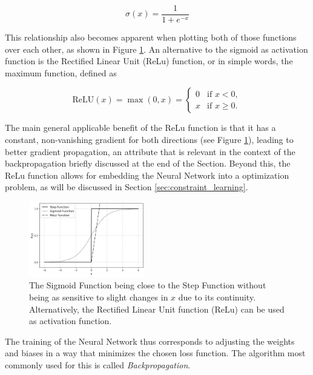 \documentclass[preprint,12pt]{elsarticle}
\begin{document}
\[
\sigma(x) = \frac{1}{1 + e^{-x}}
\]

This relationship also becomes apparent when plotting both of those functions over each other, as shown in Figure \ref{fig:activation_functions}. 
An alternative to the sigmoid as activation function is the Rectified Linear Unit (ReLu) function, or in simple words, the maximum function, defined as

\[
\text{ReLU}(x) = \max(0, x) = 
\begin{cases}
	0 & \text{if } x < 0, \\
	x & \text{if } x \geq 0.
\end{cases}
\]

The main general applicable benefit of the ReLu function is that it has a constant, non-vanishing gradient for both directions (see Figure \ref{fig:activation_functions}), leading to better gradient propagation, an attribute that is relevant in the context of the backpropagation briefly discussed at the end of the Section. \cite{preprintReLuGlorot}
Beyond this, the ReLu function allows for embedding the Neural Network into a optimization problem, as will be discussed in Section \ref{sec:constraint_learning}.

\begin{figure}[h] 
	\centering
	\includegraphics[width=0.45\textwidth]{../figures/modelling/activation_functions.png} %
	\caption{The Sigmoid Function being close to the Step Function without being as sensitive to slight changes in $x$ due to its continuity. Alternatively, the Rectified Linear Unit function (ReLu) can be used as activation function. }
	\label{fig:activation_functions}
\end{figure}

\cite{nielsen2015neuralChap1}


The training of the Neural Network thus corresponds to adjusting the weights and biases in a way that minimizes the chosen loss function. The algorithm most commonly used for this is called \textit{Backpropagation}. \cite{nielsen2015neuralChap1}
\end{document}
